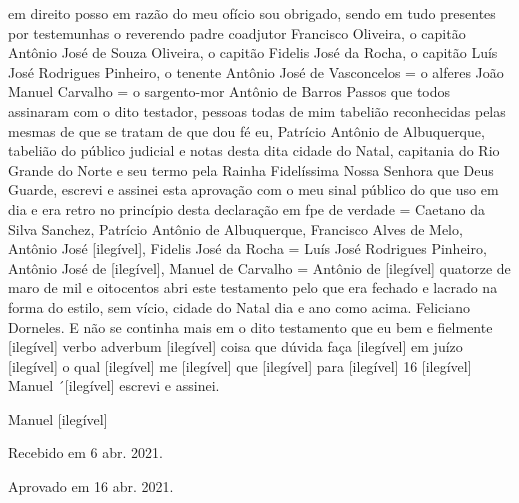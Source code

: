 \begin{refsection}
em direito posso em razão do meu ofício sou obrigado, sendo em tudo presentes por testemunhas o reverendo padre coadjutor Francisco Oliveira, o capitão Antônio José de Souza Oliveira, o capitão Fidelis José da Rocha, o capitão Luís José Rodrigues Pinheiro, o tenente Antônio José de Vasconcelos = o alferes João Manuel Carvalho = o sargento-mor Antônio de Barros Passos que todos assinaram com o dito testador, pessoas todas de mim tabelião reconhecidas pelas mesmas de que se tratam de que dou fé eu, Patrício Antônio de Albuquerque, tabelião do público judicial e notas desta dita cidade do Natal, capitania do Rio Grande do Norte e seu termo pela Rainha Fidelíssima Nossa Senhora que  Deus Guarde, escrevi e assinei esta aprovação com o meu sinal público do que uso em dia e era retro no princípio desta declaração em fpe de verdade = Caetano da Silva Sanchez, Patrício Antônio de Albuquerque, Francisco Alves de Melo, Antônio José [ilegível], Fidelis José da Rocha = Luís José Rodrigues Pinheiro, Antônio José de [ilegível], Manuel de Carvalho = Antônio de [ilegível] quatorze de maro de mil e oitocentos abri este testamento pelo que era fechado e lacrado na forma do estilo, sem vício, cidade do Natal dia e ano como acima. Feliciano Dorneles. E não se continha mais em o dito testamento que eu bem e fielmente [ilegível] verbo adverbum [ilegível] coisa que dúvida faça [ilegível] em juízo [ilegível] o qual [ilegível] me [ilegível] que [ilegível] para [ilegível] 16 [ilegível] Manuel ´[ilegível] escrevi e assinei.

    \vspace{5mm}

    \hfill Manuel [ilegível]


    \printbibliography[heading=subbibliography,notcategory=fullcited]

    \hfill Recebido em 6 abr. 2021.

    \hfill Aprovado em 16 abr. 2021.

    \label{chap:transcricaoend}

\end{refsection}
